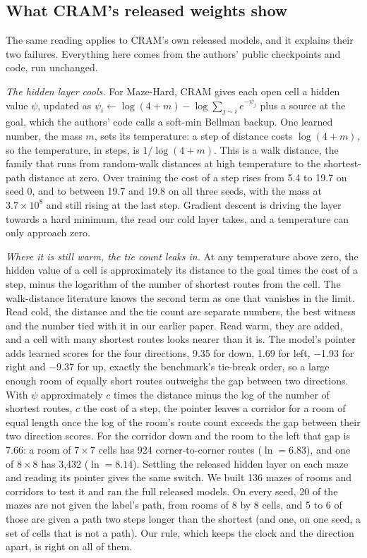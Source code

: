 \documentclass[10pt]{article}
\begin{document}
\subsection{What CRAM's released weights show}\label{sec:cramweights}

The same reading applies to CRAM's own released models, and it explains their two failures. Everything here comes from
the authors' public checkpoints and code, run unchanged.

\emph{The hidden layer cools.} For Maze-Hard, CRAM gives each open cell a hidden value $\psi$, updated as
$\psi_i \leftarrow \log(4+m) - \log \sum_{j \sim i} e^{-\psi_j}$ plus a source at the goal, which the authors' code
calls a soft-min Bellman backup. One learned number, the mass $m$, sets its temperature: a step of distance costs
$\log(4+m)$, so the temperature, in steps, is $1/\log(4+m)$. This is a walk distance, the family that runs from
random-walk distances at high temperature to the shortest-path distance at zero\cite{chebotarev2012walk,kivimaki2014developments}.
Over training the cost of a step rises from 5.4 to 19.7 on seed 0, and to between
19.7 and 19.8 on all three seeds, with the mass at $3.7\times10^{8}$ and still rising at the
last step. Gradient descent is driving the layer towards a hard minimum, the read our cold layer takes, and a
temperature can only approach zero.

\emph{Where it is still warm, the tie count leaks in.} At any temperature above zero, the hidden value of a cell is
approximately its distance to the goal times the cost of a step, minus the logarithm of the number of shortest routes
from the cell. The walk-distance literature knows the second term as one that vanishes in the
limit\cite{francoisse2017bag}. Read cold, the distance and the tie count are separate numbers, the best witness and the
number tied with it in our earlier paper. Read warm, they are added, and a cell with many shortest routes looks nearer
than it is. The model's pointer adds learned scores for the four directions, 9.35 for down, 1.69
for left, $-$1.93 for right and $-$9.37 for up, exactly the benchmark's tie-break order, so a large
enough room of equally short routes outweighs the gap between two directions. With $\psi$ approximately $c$ times the
distance minus the log of the number of shortest routes, $c$ the cost of a step, the pointer leaves a corridor for a
room of equal length once the log of the room's route count exceeds the gap between their two direction scores. For the
corridor down and the room to the left that gap is 7.66: a room of $7\times7$ cells has 924
corner-to-corner routes ($\ln = 6.83$), and one of $8\times8$ has 3,432 ($\ln =
8.14$). Settling the released hidden layer on each maze and reading its pointer gives the same switch.
We built 136 mazes of rooms
and corridors to test it and ran the full released models. On every seed,
20 of the mazes are not given the label's path, from rooms of 8 by
8 cells, and 5 to 6 of those are given
a path two steps longer than the shortest (and one, on one seed, a set of cells that is not a path). Our rule, which
keeps the clock and the direction apart, is right on all of them.
\end{document}
